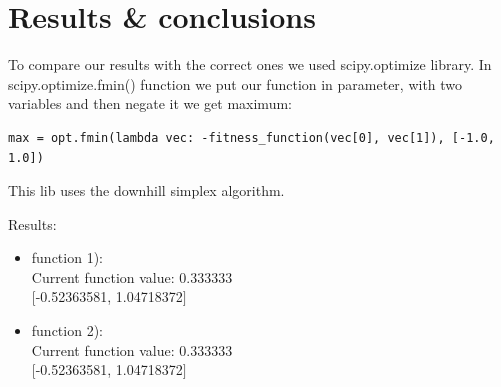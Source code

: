 \documentclass[a4paper, 12pt]{article}
\begin{document}
\section{Results \& conclusions}

To compare our results with the correct ones we used scipy.optimize library. In scipy.optimize.fmin() function we put our function in parameter, with two variables and then negate it we get maximum: 
\begin{lstlisting}
max = opt.fmin(lambda vec: -fitness_function(vec[0], vec[1]), [-1.0, 1.0])
\end{lstlisting}
This lib uses the downhill simplex algorithm.

Results:
\begin{itemize}
	\item function 1): \\  Current function value: 0.333333 \\ $[$-0.52363581,  1.04718372$]$
	\item function 2): 	\\  Current function value: 0.333333 \\ $[$-0.52363581,  1.04718372$]$
		
\end{itemize}
\end{document}
